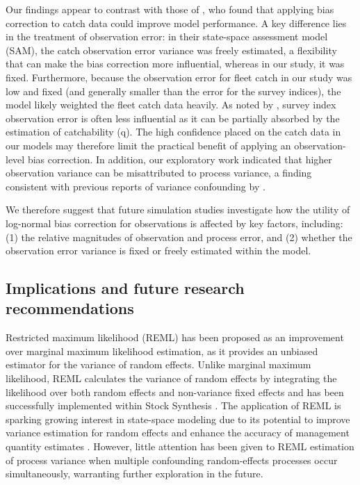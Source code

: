 \documentclass[
  12pt,
]{article}
\begin{document}
Our findings appear to contrast with those of \citet{aldrin2020}, who
found that applying bias correction to catch data could improve model
performance. A key difference lies in the treatment of observation
error: in their state-space assessment model (SAM), the catch
observation error variance was freely estimated, a flexibility that can
make the bias correction more influential, whereas in our study, it was
fixed. Furthermore, because the observation error for fleet catch in our
study was low and fixed (and generally smaller than the error for the
survey indices), the model likely weighted the fleet catch data heavily.
As noted by \citet{aldrin2020}, survey index observation error is often
less influential as it can be partially absorbed by the estimation of
catchability (q). The high confidence placed on the catch data in our
models may therefore limit the practical benefit of applying an
observation-level bias correction. In addition, our exploratory work
indicated that higher observation variance can be misattributed to
process variance, a finding consistent with previous reports of variance
confounding by \citet{Fisch2023}.

We therefore suggest that future simulation studies investigate how the
utility of log-normal bias correction for observations is affected by
key factors, including: (1) the relative magnitudes of observation and
process error, and (2) whether the observation error variance is fixed
or freely estimated within the model.

\subsection{Implications and future research
recommendations}\label{implications-and-future-research-recommendations}

Restricted maximum likelihood (REML) has been proposed as an improvement
over marginal maximum likelihood estimation, as it provides an unbiased
estimator for the variance of random effects. Unlike marginal maximum
likelihood, REML calculates the variance of random effects by
integrating the likelihood over both random effects and non-variance
fixed effects and has been successfully implemented within Stock
Synthesis \citep{Thorson2015}. The application of REML is sparking
growing interest in state-space modeling due to its potential to improve
variance estimation for random effects and enhance the accuracy of
management quantity estimates \citep{Maunder2019, Thorson2019}. However,
little attention has been given to REML estimation of process variance
when multiple confounding random-effects processes occur simultaneously,
warranting further exploration in the future.
\end{document}
